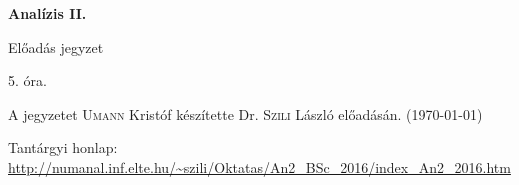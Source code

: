 \documentclass[a4paper,11.5pt]{article}
\begin{document}
	\setlength\parindent{0pt}
	\def\s{\hspace{0.2mm}\vphantom{\beta}}
	\def\Z{\mathbb{Z}}
	\def\Q{\mathbb{Q}}
	\def\R{\mathbb{R}}
	\def\C{\mathbb{C}}
	\def\N{\mathbb{N}}
	\def\Ra{\overline{\mathbb{R}}}
	
	\def\sume{\displaystyle\sum_{n=1}^{+\infty}}
	\def\sumn{\displaystyle\sum_{n=0}^{+\infty}}
	
	\def\narrow{\underset{n\rightarrow+\infty}{\longrightarrow}}
	\def\limn{\displaystyle\lim_{n\to +\infty}}
	\def\limx{\displaystyle\lim_{x\to +\infty}}
	
	\theoremstyle{definition}
	\newtheorem{theorem}{Tétel}[subsection] 
	
	\theoremstyle{definition}
	\newtheorem{definition}[theorem]{Definíció} 
	\newtheorem{example}[theorem]{Példa} 
	\newtheorem{task}[theorem]{Feladat} 
	\newtheorem{note}[theorem]{Megjegyzés}
	\newtheorem{revision}[theorem]{Emlékeztető}
	\begin{center}
		{\LARGE\textbf{Analízis II.}}
		
		{\Large Előadás jegyzet}
		
		5. óra.
	\end{center}
	A jegyzetet \textsc{Umann} Kristóf készítette Dr. \textsc{Szili} László  előadásán. (\today)
	
	
	Tantárgyi honlap: \url{http://numanal.inf.elte.hu/~szili/Oktatas/An2_BSc_2016/index_An2_2016.htm}
\end{document}
